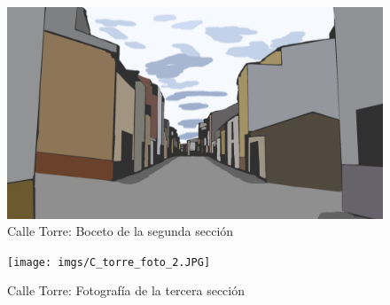 \documentclass[12pt]{article}
\begin{document}
    \begin{figure}[h!]
        \centering
        \includegraphics[width=\textwidth]{imgs/c_torre_2.png}
        \caption{Calle Torre: Boceto de la segunda sección}
        \label{fig:torre_boceto_2}
    \end{figure}
    \clearpage
    \begin{figure}[h!]
        \centering
        \texttt{[image: imgs/C\_torre\_foto\_2.JPG]}
        \caption{Calle Torre: Fotografía de la tercera sección}
        \label{fig:torre_foto_3}
    \end{figure}
\end{document}
